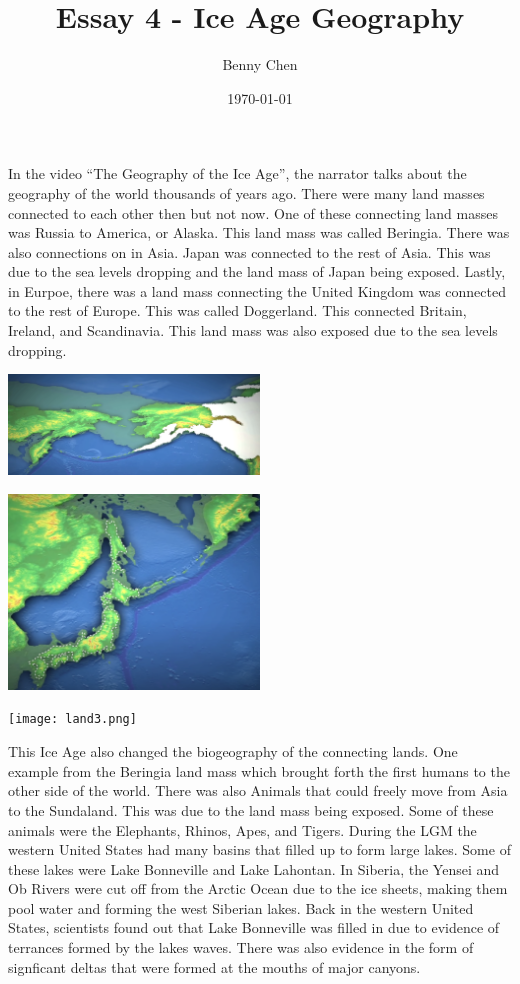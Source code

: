 \documentclass{article}
\title{Essay 4 - Ice Age Geography}
\author{Benny Chen}
\date{\today}
\begin{document}
\maketitle

In the video ``The Geography of the Ice Age'', the narrator talks about the geography of the world thousands of years ago. There were many land masses connected to each other then but not now. One of these connecting land masses was Russia to America, or Alaska. This land mass was called Beringia. There was also connections on in Asia. Japan was connected to the rest of Asia. This was due to the sea levels dropping and the land mass of Japan being exposed. Lastly, in Eurpoe, there was a land mass connecting the United Kingdom was connected to the rest of Europe. This was called Doggerland. This connected Britain, Ireland, and Scandinavia. This land mass was also exposed due to the sea levels dropping. 

\begin{center}
    \includegraphics[width=0.5\textwidth]{land1.png}
\end{center}

\begin{center}
    \includegraphics[width=0.5\textwidth]{land2.png}
\end{center}

\begin{center}
    \texttt{[image: land3.png]}
\end{center}

This Ice Age also changed the biogeography of the connecting lands. One example from the Beringia land mass which brought forth the first humans to the other side of the world. There was also Animals that could freely move from Asia to the Sundaland. This was due to the land mass being exposed. Some of these animals were the Elephants, Rhinos, Apes, and Tigers. During the LGM the western United States had many basins that filled up to form large lakes. Some of these lakes were Lake Bonneville and Lake Lahontan. In Siberia, the Yensei and Ob Rivers were cut off from the Arctic Ocean due to the ice sheets, making them pool water and forming the west Siberian lakes. Back in the western United States, scientists found out that Lake Bonneville was filled in due to evidence of terrances formed by the lakes waves. There was also evidence in the form of signficant deltas that were formed at the mouths of major canyons.
\end{document}
